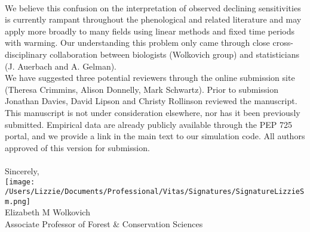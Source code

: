 \documentclass[11pt,a4paper]{article}
\begin{document}
\vspace{1.5ex}\\
We believe this confusion on the interpretation of observed declining sensitivities is currently rampant throughout the phenological \citep[e.g.,][]{fu2015,Samplonius:2018aa,vitasse2018,meng2020} and related literature \citep[e.g.,][]{piao2017} and may apply more broadly to many fields using linear methods and fixed time periods with warming. Our understanding this problem only came through close cross-disciplinary collaboration between biologists (Wolkovich group) and statisticians (J. Auerbach and A. Gelman). 
\vspace{1.5ex}\\
We have suggested three potential reviewers through the online submission site (Theresa Crimmins, Alison Donnelly, Mark Schwartz). Prior to submission Jonathan Davies, David Lipson and Christy Rollinson reviewed the manuscript. This manuscript is not under consideration elsewhere, nor has it been previously submitted. Empirical data are already publicly available through the PEP 725 portal, and we provide a link in the main text to our simulation code. All authors approved of this version for submission. \\
\vspace{1.5ex}\\
Sincerely,\\

\texttt{[image: /Users/Lizzie/Documents/Professional/Vitas/Signatures/SignatureLizzieSm.png]} \\

\noindent Elizabeth M Wolkovich\\
Associate Professor of Forest \& Conservation Sciences\\ 


\end{document}
